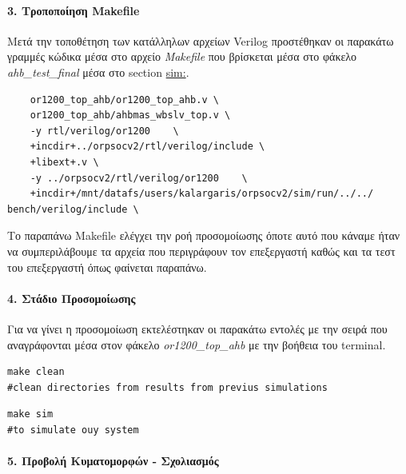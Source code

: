 \documentclass[a4paper,10pt]{article}
\numberwithin{figure}{section}
\numberwithin{table}{section}
\begin{document}
\paragraph{3. Τροποποίηση Makefile\newline\newline}
Μετά την τοποθέτηση των κατάλληλων αρχείων Verilog προστέθηκαν οι παρακάτω γραμμές κώδικα μέσα στο αρχείο \emph{Makefile} που βρίσκεται μέσα στο φάκελο \emph{ahb\_test\_final} μέσα στο section \underline{sim:}.
\vspace{0.7cm}
\begin{lstlisting}
	or1200_top_ahb/or1200_top_ahb.v \
	or1200_top_ahb/ahbmas_wbslv_top.v \
	-y rtl/verilog/or1200    \
	+incdir+../orpsocv2/rtl/verilog/include \
	+libext+.v \
	-y ../orpsocv2/rtl/verilog/or1200    \
	+incdir+/mnt/datafs/users/kalargaris/orpsocv2/sim/run/../../
bench/verilog/include \
\end{lstlisting}
\vspace{0.7cm}
Το παραπάνω Makefile ελέγχει την ροή προσομοίωσης όποτε αυτό που κάναμε ήταν να συμπεριλάβουμε τα αρχεία που περιγράφουν τον επεξεργαστή καθώς και τα τεστ του επεξεργαστή όπως φαίνεται παραπάνω.

\paragraph{4. Στάδιο Προσομοίωσης \newline\newline}

Για να γίνει η προσομοίωση εκτελέστηκαν οι παρακάτω εντολές με την σειρά που αναγράφονται μέσα στον φάκελο \emph{or1200\_top\_ahb} με την βοήθεια του terminal.
\vspace{0.7cm}
\begin{lstlisting}
make clean
#clean directories from results from previus simulations
\end{lstlisting}
\vspace{0.7cm}
\begin{lstlisting}
make sim
#to simulate ouy system
\end{lstlisting}
\vspace{0.7cm}



\paragraph{5. Προβολή Κυματομορφών - Σχολιασμός \newline\newline}
\end{document}

